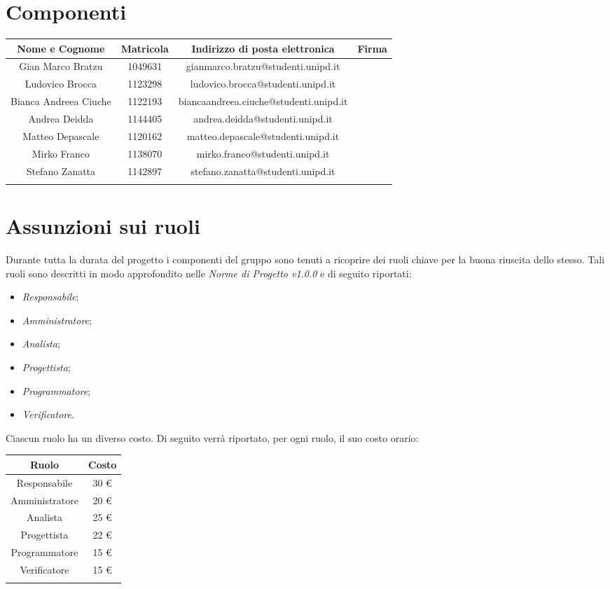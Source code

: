 \section{Componenti}

		\begin{tabularx}{\textwidth}{|C|c|c|C|}
			\hline
			\textbf{Nome e Cognome} & \textbf{Matricola} & \textbf{Indirizzo di posta elettronica} & \textbf{Firma} \\
			\hline 
			Gian Marco Bratzu & 1049631 &gianmarco.bratzu@studenti.unipd.it & \\
			\hline
			Ludovico Brocca & 1123298 & ludovico.brocca@studenti.unipd.it & \\
			\hline
			Bianca Andreea Ciuche & 1122193 & biancaandreea.ciuche@studenti.unipd.it & \\
			\hline
			Andrea Deidda & 1144405 & andrea.deidda@studenti.unipd.it & \\
			\hline
			Matteo Depascale & 1120162 & matteo.depascale@studenti.unipd.it & \\
			\hline
			Mirko Franco & 1138070 &  mirko.franco@studenti.unipd.it & \\
			\hline
			Stefano Zanatta & 1142897 & stefano.zanatta@studenti.unipd.it
			& \\
			\hline
			\caption{Componenti}
		\end{tabularx}
			

\section{Assunzioni sui ruoli}
	Durante tutta la durata del progetto i componenti del gruppo sono tenuti a ricoprire dei ruoli chiave per la buona riuscita dello stesso.
	Tali ruoli sono descritti in modo approfondito nelle \textit{Norme di Progetto v1.0.0} e di seguito riportati:
	\begin{itemize}
		\item \textit{Responsabile};
		\item \textit{Amministratore};
		\item \textit{Analista};
		\item \textit{Progettista};
		\item \textit{Programmatore};
		\item \textit{Verificatore}.
	\end{itemize}
	Ciascun ruolo ha un diverso costo. Di seguito verrà riportato, per ogni ruolo, il suo costo orario:

		\begin{tabularx}{\textwidth}{|c|c|}
			\hline
			\textbf{Ruolo} & \textbf{Costo} \\
			\hline
			Responsabile & 30 \euro \\
			Amministratore & 20 \euro \\
			Analista & 25 \euro \\
			Progettista & 22 \euro \\
			Programmatore & 15 \euro \\
			Verificatore & 15 \euro \\
			\hline
			\caption{Costi per ruolo}
		\end{tabularx}
